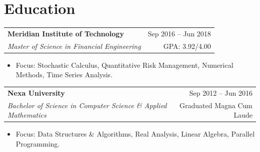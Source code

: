 \documentclass[10pt,letterpaper]{article}
\begin{document}
\section{Education}

\noindent
\begin{tabularx}{\textwidth}{@{} X r @{}}
  \textbf{\color{primary}Meridian Institute of Technology} & \color{muted}\small Sep 2016 -- Jun 2018 \\
  \textit{Master of Science in Financial Engineering} & \color{muted}\small GPA: 3.92/4.00 \\
\end{tabularx}
\vspace{-4pt}
\begin{itemize}
  \item Focus: Stochastic Calculus, Quantitative Risk Management, Numerical Methods, Time Series Analysis.
\end{itemize}

\vspace{4pt}

\noindent
\begin{tabularx}{\textwidth}{@{} X r @{}}
  \textbf{\color{primary}Nexa University} & \color{muted}\small Sep 2012 -- Jun 2016 \\
  \textit{Bachelor of Science in Computer Science \& Applied Mathematics} & \color{muted}\small Graduated Magna Cum Laude \\
\end{tabularx}
\vspace{-4pt}
\begin{itemize}
  \item Focus: Data Structures \& Algorithms, Real Analysis, Linear Algebra, Parallel Programming.
\end{itemize}
\end{document}
